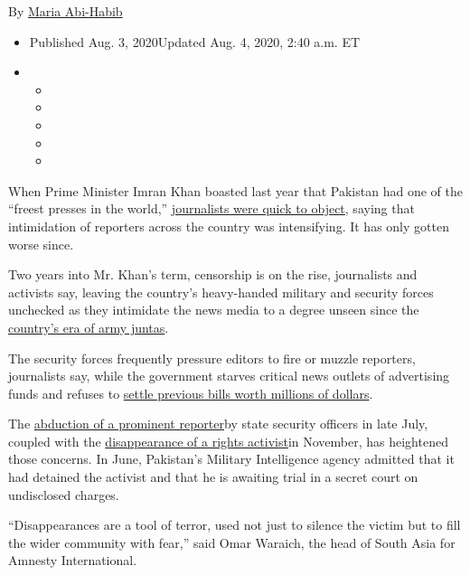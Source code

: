 By \href{https://www.nytimes.com/by/maria-abi-habib}{Maria Abi-Habib}

\begin{itemize}
\item
  Published Aug. 3, 2020Updated Aug. 4, 2020, 2:40 a.m. ET
\item
  \begin{itemize}
  \item
  \item
  \item
  \item
  \item
  \end{itemize}
\end{itemize}

When Prime Minister Imran Khan boasted last year that Pakistan had one
of the ``freest presses in the world,''
\href{https://rsf.org/en/news/after-year-press-freedom-violations-rsf-writes-pakistans-premier}{journalists
were quick to object}, saying that intimidation of reporters across the
country was intensifying. It has only gotten worse since.

Two years into Mr. Khan's term, censorship is on the rise, journalists
and activists say, leaving the country's heavy-handed military and
security forces unchecked as they intimidate the news media to a degree
unseen since the
\href{https://tribune.com.pk/story/459782/when-musharraf-silenced-the-media}{country's
era of army juntas}.

The security forces frequently pressure editors to fire or muzzle
reporters, journalists say, while the government starves critical news
outlets of advertising funds and refuses to
\href{https://www.thenews.com.pk/print/659532-extraordinary-delay-in-payment-of-media-dues-apns-extremely-concerned-over-govt-inaction}{settle
previous bills worth millions of dollars}.

The \href{https://www.dawn.com/news/1570325}{abduction of a prominent
reporter}by state security officers in late July, coupled with the
\href{https://www.amnesty.org/en/get-involved/take-action/where-is-idris-khattak/}{disappearance
of a rights activist}in November, has heightened those concerns. In
June, Pakistan's Military Intelligence agency admitted that it had
detained the activist and that he is awaiting trial in a secret court on
undisclosed charges.

``Disappearances are a tool of terror, used not just to silence the
victim but to fill the wider community with fear,'' said Omar Waraich,
the head of South Asia for Amnesty International.


